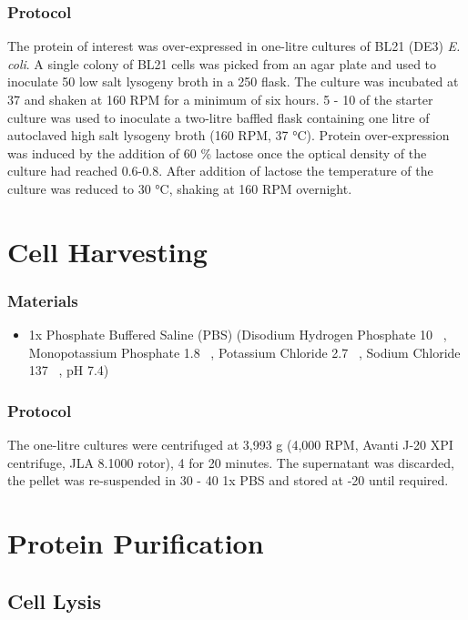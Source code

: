 		\subsubsection{Protocol}
			The protein of interest was over-expressed in one-litre cultures of BL21 (DE3) \textit{E. coli}. A single colony of BL21 \ecoli cells was picked from an agar plate and used to inoculate 50 \ml low salt lysogeny broth in a 250 \ml flask. The culture was incubated at 37 \degrees and shaken at 160 RPM for a minimum of six hours. 5 \ml - 10 \ml of the starter culture was used to inoculate a two-litre baffled flask containing one litre of autoclaved high salt lysogeny broth (160 RPM, 37 \si{\degreeCelsius}). Protein over-expression was induced by the addition of 60 \% lactose once the optical density of the culture had reached 0.6-0.8. After addition of lactose the temperature of the culture was reduced to 30 \si{\degreeCelsius}, shaking at 160 RPM overnight.
	  
	\section{Cell Harvesting}
	\subsubsection{Materials}
			\begin{itemize}
			\item 1x Phosphate Buffered Saline (PBS) (Disodium Hydrogen Phosphate 10 \si{\milli\molar}, Monopotassium Phosphate 1.8 \si{\milli\molar}, Potassium Chloride 2.7 \si{\milli\molar}, Sodium Chloride 137 \si{\milli\molar}, pH 7.4)   
			\end{itemize}
		
		\subsubsection{Protocol}
The one-litre cultures were centrifuged at 3,993 g (4,000 RPM, Avanti J-20 XPI centrifuge, JLA 8.1000 rotor), 4 \degrees for 20 minutes. The supernatant was discarded, the pellet was re-suspended in 30 \ml- 40 \ml 1x PBS and stored at -20 \degrees until required.  

\newpage  
	\section{Protein Purification}
		\subsection*{Cell Lysis}
		\label{sec:Lysis_Methods}
